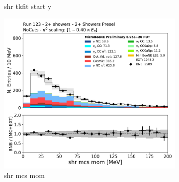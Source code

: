 \begin{figure}[H]
\begin{subfigure}{0.3\textwidth}
    \caption{shr tkfit start y}
    \end{subfigure}
    \begin{subfigure}{0.3\textwidth}
    \includegraphics[width=1.0\textwidth]{Sidebands/Figures/TwoShr_1e0pSel/Presel/shrMCSMom.pdf}
    \caption{shr mcs mom}
    \end{subfigure}
    \caption{} 
    \label{fig:HE_1eNp_1}
\end{figure}


